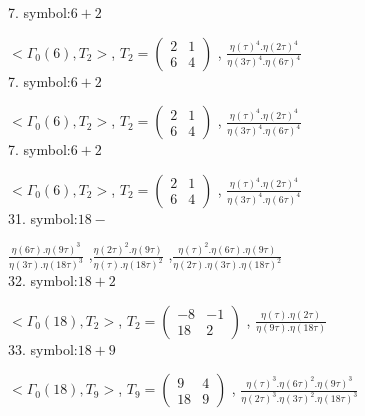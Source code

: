 
7. symbol:$ 6+2 $

$ < \Gamma_0 ( 6 ), T_2 >  $,
$
T_2 = 
\left(
\begin{array}{cc}
2 & 1 \\
6 & 4
\end{array}
\right)
$
, {$ \frac{\eta(\tau)^4 . \eta(2\tau)^4}{\eta(3\tau)^4 . \eta(6\tau)^4} $}
\\

7. symbol:$ 6+2 $

$ < \Gamma_0 ( 6 ), T_2 >  $,
$
T_2 = 
\left(
\begin{array}{cc}
2 & 1 \\
6 & 4
\end{array}
\right)
$
, {$ \frac{\eta(\tau)^4 . \eta(2\tau)^4}{\eta(3\tau)^4 . \eta(6\tau)^4} $}
\\

7. symbol:$ 6+2 $

$ < \Gamma_0 ( 6 ), T_2 >  $,
$
T_2 = 
\left(
\begin{array}{cc}
2 & 1 \\
6 & 4
\end{array}
\right)
$
, {$ \frac{\eta(\tau)^4 . \eta(2\tau)^4}{\eta(3\tau)^4 . \eta(6\tau)^4} $}
\\

31. symbol:$ 18- $

{$ \frac{\eta(6\tau) . \eta(9\tau)^3}{\eta(3\tau) . \eta(18\tau)^3} $}
,{$ \frac{\eta(2\tau)^2 . \eta(9\tau)}{\eta(\tau) . \eta(18\tau)^2} $}
,{$ \frac{\eta(\tau)^2 . \eta(6\tau) .\eta(9\tau)}{\eta(2\tau) . \eta(3\tau). \eta(18\tau)^2} $}
\\

32. symbol:$ 18+2 $

$ < \Gamma_0 ( 18 ), T_2 >  $,
$
T_2 = 
\left(
\begin{array}{cc}
-8 & -1 \\
18 & 2
\end{array}
\right)
$
, {$ \frac{\eta(\tau) . \eta(2\tau)}{\eta(9\tau) . \eta(18\tau)} $}
\\

33. symbol:$ 18+9 $

$ < \Gamma_0 ( 18 ), T_9 >  $,
$
T_9 = 
\left(
\begin{array}{cc}
9 & 4 \\
18 & 9
\end{array}
\right)
$
, {$ \frac{\eta(\tau)^3 . \eta(6\tau)^2 .\eta(9\tau)^3}{\eta(2\tau)^3 . \eta(3\tau)^2 . \eta(18\tau)^3} $}
\\

